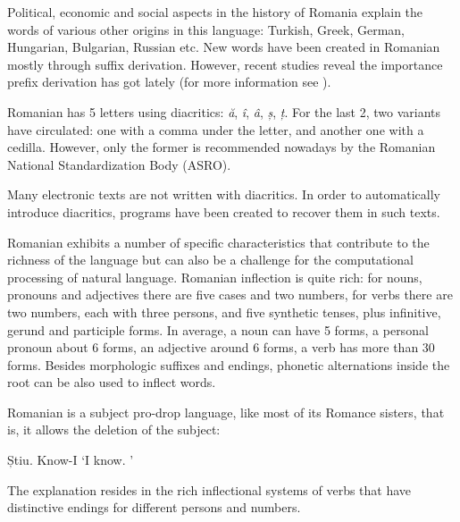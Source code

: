 \documentclass[]{../../metanetpaper}
\begin{document}
\begin{multicols}{2}
Political, economic and social aspects in the history of Romania explain the words of various other origins in this language: Turkish, Greek, German, Hungarian, Bulgarian, Russian etc. New words have been created in Romanian mostly through suffix derivation. However, recent studies reveal the importance prefix derivation has got lately (for more information see \cite{brancus}).


Romanian has 5 letters using diacritics: \textit{ă}, \textit{î}, \textit{â}, \textit{ș}, \textit{ț}. For the last 2, two variants have circulated: one with a comma under the letter, and another one with a cedilla. However, only the former is recommended nowadays by the Romanian National Standardization Body (ASRO).

Many electronic texts are not written with diacritics. In order to automatically introduce diacritics, programs have been created to recover them in such texts.

Romanian exhibits a number of specific characteristics that contribute to the richness of the language but can also be a challenge for the computational processing of natural language. Romanian inflection is quite rich: for nouns, pronouns and adjectives there are five cases and two numbers, for verbs there are two numbers, each with three persons, and five synthetic tenses, plus infinitive, gerund and participle forms. In average, a noun can have 5 forms, a personal pronoun about 6 forms, an adjective around 6 forms, a verb has more than 30 forms. Besides morphologic suffixes and endings, phonetic alternations inside the root can be also used to inflect words.


Romanian is a subject pro-drop language, like most of its Romance sisters, that is, it allows the deletion of the subject:

\begin{example}
\gll Știu. 
Know-I
\glt `I know. '
\glend
\end{example}

The explanation resides in the rich inflectional systems of verbs that have distinctive endings for different persons and numbers.


\end{multicols}
\end{document}
